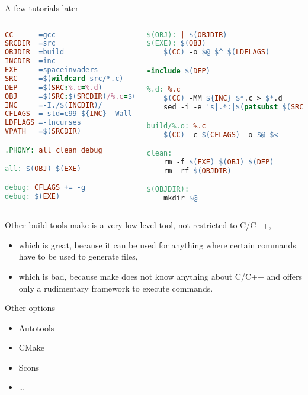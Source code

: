 \begin{frame}[fragile]{A few tutorials later}
	\begin{columns}
	\begin{lstlisting}[language=make,basicstyle=\tiny,escapeinside=§]
CC		=gcc
SRCDIR 	=src
OBJDIR	=build
INCDIR	=inc
EXE		=spaceinvaders
SRC 	=$(wildcard src/*.c)
DEP		=$(SRC:%.c=%.d)
OBJ		=$(SRC:$(SRCDIR)/%.c=$(OBJDIR)/%.o)
INC		=-I./$(INCDIR)/
CFLAGS	=-std=c99 ${INC} -Wall -Wextra -Wpedantic -Werror
LDFLAGS	=-lncurses
VPATH 	=$(SRCDIR)

.PHONY: all clean debug

all: $(OBJ) $(EXE)

debug: CFLAGS += -g
debug: $(EXE)
\end{lstlisting}
	\begin{lstlisting}[language=make,basicstyle=\tiny,escapeinside=§,firstnumber=20]
$(OBJ): | $(OBJDIR)
$(EXE): $(OBJ)
	$(CC) -o $@ $^ $(LDFLAGS)

-include $(DEP)

%.d: %.c
	$(CC) -MM ${INC} $*.c > $*.d
	sed -i -e 's|.*:|$(patsubst $(SRCDIR)/%,$(OBJDIR)/%,$*).o:|' $*.d

build/%.o: %.c
	$(CC) -c $(CFLAGS) -o $@ $<

clean:
	rm -f $(EXE) $(OBJ) $(DEP)
	rm -rf $(OBJDIR)

$(OBJDIR):
	mkdir $@
\end{lstlisting}
	\end{columns}
\end{frame}

\begin{frame}{Other build tools}
	make is a very low-level tool, not restricted to C/C++,
	\begin{itemize}
	  \item which is great, because it can be used for anything where certain commands have to be used to generate files,
	  \item which is bad, because make does not know anything about C/C++ and offers only a rudimentary framework to execute commands.
	\end{itemize}

	Other options
	\begin{itemize}
	  \item Autotools
	  \item CMake
	  \item Scons
	  \item …
	\end{itemize}
\end{frame}

